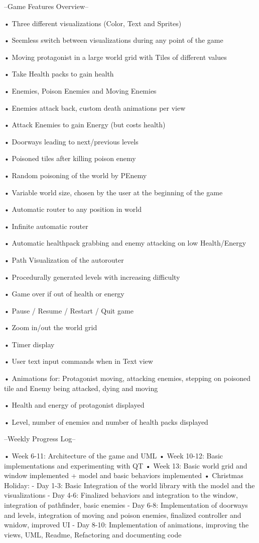 --Game Features Overview-- \begin{DoxyVerb}• Three different visualizations (Color, Text and Sprites)

• Seemless switch between visualizations during any point of the game

• Moving protagonist in a large world grid with Tiles of different values

• Take Health packs to gain health

• Enemies, Poison Enemies and Moving Enemies

• Enemies attack back, custom death animations per view

• Attack Enemies to gain Energy (but costs health)

• Doorways leading to next/previous levels

• Poisoned tiles after killing poison enemy

• Random poisoning of the world by PEnemy

• Variable world size, chosen by the user at the beginning of the game

• Automatic router to any position in world

• Infinite automatic router 

• Automatic healthpack grabbing and enemy attacking on low Health/Energy 

• Path Visualization of the autorouter

• Procedurally generated levels with increasing difficulty

• Game over if out of health or energy

• Pause / Resume / Restart / Quit game

• Zoom in/out the world grid

• Timer display

• User text input commands when in Text view

• Animations for: Protagonist moving, attacking enemies, stepping on poisoned tile and Enemy being attacked, dying and moving

• Health and energy of protagonist displayed

• Level, number of enemies and number of health packs displayed
\end{DoxyVerb}


--Weekly Progress Log-- \begin{DoxyVerb}• Week 6-11: Architecture of the game and UML
• Week 10-12: Basic implementations and experimenting with QT
• Week 13: Basic world grid and window implemented + model and basic behaviors implemented
• Christmas Holiday: 
    - Day 1-3: Basic Integration of the world library with the model and the visualizations
    - Day 4-6: Finalized behaviors and integration to the window, integration of pathfinder, basic enemies
    - Day 6-8: Implementation of doorways and levels, integration of moving and poison enemies, finalized controller and wnidow, improved UI 
    - Day 8-10: Implementation of animations, improving the views, UML, Readme, Refactoring and documenting code
\end{DoxyVerb}
 